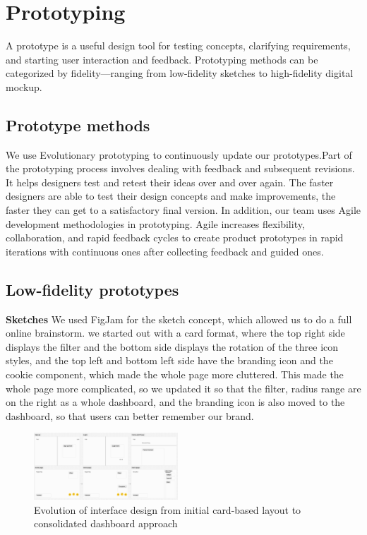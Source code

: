 \section{Prototyping}

A prototype is a useful design tool for testing concepts, clarifying requirements, and starting user interaction and feedback.
Prototyping methods can be categorized by fidelity—ranging from low-fidelity sketches to high-fidelity digital mockup.


\subsection{Prototype methods}
We use Evolutionary prototyping to continuously update our prototypes.Part of the prototyping process involves dealing with feedback and subsequent revisions. It helps designers test and retest their ideas over and over again. The faster designers are able to test their design concepts and make improvements, the faster they can get to a satisfactory final version. In addition, our team uses Agile development methodologies in prototyping. Agile increases flexibility, collaboration, and rapid feedback cycles to create product prototypes in rapid iterations with continuous ones after collecting feedback and guided ones.


\subsection{Low-fidelity prototypes}

\item \textbf{Sketches}
We used FigJam for the sketch concept, which allowed us to do a full online brainstorm. we started out with a card format, where the top right side displays the filter and the bottom side displays the rotation of the three icon styles, and the top left and bottom left side have the branding icon and the cookie component, which made the whole page more cluttered. This made the whole page more complicated, so we updated it so that the filter, radius range are on the right as a whole dashboard, and the branding icon is also moved to the dashboard, so that users can better remember our brand.


\begin{figure}[h]
    \centering
    \includegraphics[width=0.48\textwidth]{images/sketch.jpg}
    \caption{Evolution of interface design from initial card-based layout to consolidated dashboard approach}
    \label{fig:prototype-evolution}
\end{figure}

